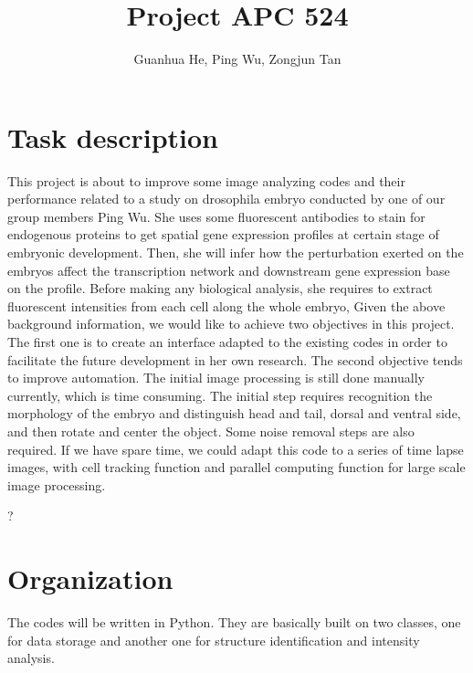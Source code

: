 \documentclass[a4paper,12pt]{article}
\title{Project APC 524}
\author{Guanhua He, Ping Wu, Zongjun Tan}
\theoremstyle{remark}
\numberwithin{equation}{section}
\begin{document}
 \maketitle
	
	
	\section{Task description}
	
This project is about to improve some image analyzing codes and their performance related to a study on drosophila embryo conducted by one of our group
members Ping Wu. She uses some fluorescent antibodies to stain for endogenous proteins to get spatial gene expression profiles at certain stage of embryonic development. Then, she will infer how the perturbation exerted on the embryos affect the transcription network and downstream gene expression base on the profile. Before making any biological analysis, she requires to extract fluorescent intensities from each cell along the whole embryo,
Given the above background information, we would like to achieve two objectives in this project. The first one is to create an interface adapted to the existing
codes in order to facilitate the future development in her own research. The second objective tends to improve automation. The initial image processing is still done manually currently, which is time consuming. The initial step requires recognition the morphology of the embryo and distinguish head and tail, dorsal and ventral side, and then rotate and center the object. Some noise removal steps are also required. If we have spare time, we could adapt this code to a series of time lapse images, with cell tracking function and parallel computing function for large scale image processing.

?	%
	
	\section{Organization}

	The codes will be written in Python. They are basically built on two classes, one for data storage and another one for structure identification and intensity analysis. 
	
\end{document}
